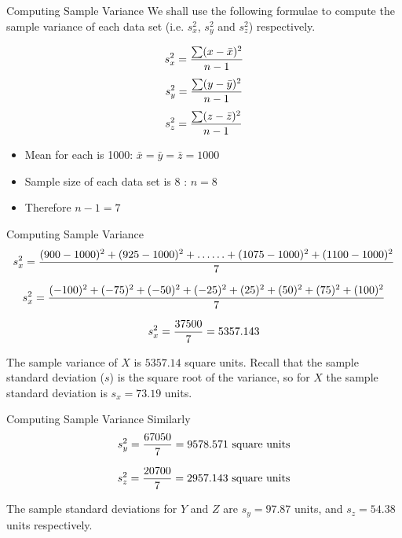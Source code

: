 {
	{Computing Sample Variance}
We shall use the following formulae to compute the sample variance of each data set (i.e. $s^2_x$, $s^2_y$ and $s^2_z$) respectively.

\[ s^2_x = { \sum (x-\bar{x})^2  \over n-1}\]
\[ s^2_y = { \sum (y-\bar{y})^2  \over n-1}\]
\[ s^2_z = { \sum (z-\bar{z})^2  \over n-1}\]
\begin{itemize}
\item Mean for each is 1000: $\bar{x} = \bar{y} = \bar{z}  = 1000$
\item Sample size of each data set is 8 : $ n=8 $
\item Therefore $ n-1 = 7$
\end{itemize}
}
{
	{Computing Sample Variance}
\small
\[ s^2_x = {(900-1000)^2 +(925-1000)^2+ \ldots \ldots +(1075-1000)^2+(1100-1000)^2   \over 7}\]

\[ s^2_x = {(-100)^2 +(-75)^2 +(-50)^2+(-25)^2 + (25)^2 +(50)^2 +(75)^2+(100)^2   \over 7}\]

\[ s^2_x = {37500 \over 7}  = 5357.143\]

\normalsize
\bigskip The sample variance of $X$ is $5357.14$ square units. Recall that the sample standard deviation ($s$) is the square root of the variance, so for $X$  the sample standard deviation is $s_x = 73.19$ units.

}

{
	{Computing Sample Variance}
Similarly \small
\[ s^2_y = {67050 \over 7}  = 9578.571 \mbox{ square units} \]

\[ s^2_z = {20700  \over 7} = 2957.143 \mbox{ square units} \]


\normalsize
\bigskip The sample standard deviations for $Y$ and $Z$ are $s_y = 97.87$ units, and $s_z =  54.38$ units respectively.
}



